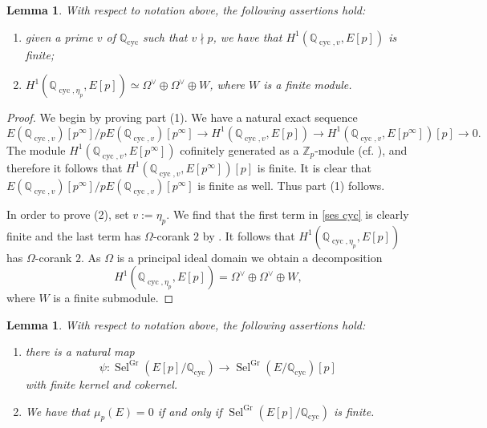 \documentclass[12pt]{amsart}
\newtheorem{lemma}[theorem]{Lemma}
\newcommand{\Z}{\mathbb{Z}}
\newcommand{\Q}{\mathbb{Q}}
\newcommand{\op}[1]{\operatorname{#1}}
\numberwithin{equation}{section}
\begin{document}
\begin{lemma}
\label{lem:local}
    With respect to notation above, the following assertions hold:
\begin{enumerate}
    \item given a prime $v$ of $\Q_{\op{cyc}}$ such that $v\nmid p$, we have that $H^1(\Q_{\op{cyc}, v}, E[p])$ is finite; 
    \item $H^1(\Q_{\op{cyc}, \eta_p}, E[p])\simeq \Omega^\vee\oplus \Omega^\vee\oplus W$,
    where $W$ is a finite module. 
\end{enumerate}
    
    
\end{lemma}
\begin{proof}
We begin by proving part (1). 
We have a natural exact sequence
   \begin{equation}\label{ses cyc}E(\Q_{\op{cyc},v})[p^\infty]/pE(\Q_{\op{cyc},v})[p^\infty]\to H^1(\Q_{\op{cyc},v},E[p])\to H^1(\Q_{\op{cyc},v},E[p^\infty])[p]\to 0. \end{equation}
The module $H^1(\Q_{\op{cyc},v},E[p^\infty])$ cofinitely generated as a $\Z_p$-module (cf. \cite[p.33]{greenberg-vatsal}), and therefore it follows that $H^1(\Q_{\op{cyc},v},E[p^\infty])[p]$ is finite. It is clear that $E(\Q_{\op{cyc},v})[p^\infty]/pE(\Q_{\op{cyc},v})[p^\infty]$ is finite as well. Thus part (1) follows.
  \par In order to prove (2), set $v:=\eta_p$. We find that the first term in \eqref{ses cyc} is clearly finite and the last term has $\Omega$-corank $2$ by \cite[Proposition 1, p.109]{Greenberpadic}. It follows that $H^1(\Q_{\op{cyc},\eta_p},E[p])$ has $\Omega$-corank $2$. As $\Omega$ is a principal ideal domain we obtain a decomposition
   \[H^1(\Q_{\op{cyc},\eta_p},E[p])=\Omega^\vee\oplus \Omega^\vee \oplus W,\]
   where $W$ is a finite submodule.
\end{proof}
\begin{lemma}\label{mu=0 criterion lemma} With respect to notation above, the following assertions hold:
\begin{enumerate}
    \item there is a natural map 
    \[\psi\colon \op{Sel}^{\op{Gr}}(E[p]/\Q_{\op{cyc}})\rightarrow \op{Sel}^{\op{Gr}}(E/\Q_{\op{cyc}})[p]\] with finite kernel and cokernel.
    \item  We have that $\mu_p(E)=0$ if and only if $\op{Sel}^{\op{Gr}}(E[p]/\Q_{\op{cyc}})$ is finite.
\end{enumerate}

    
\end{lemma}
\end{document}
